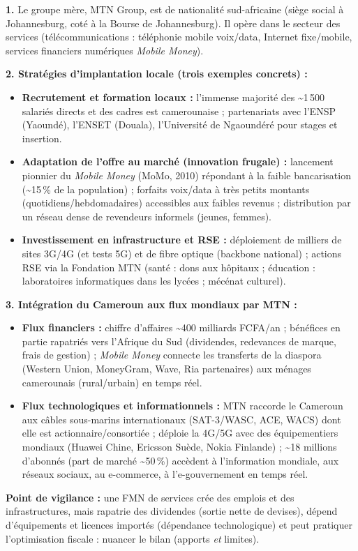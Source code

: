 \documentclass[11pt]{article}
\newcommand{\cle}[1]{{\popxbold\color{popdark}#1}}
\begin{document}
\begin{corrige}
\textbf{1.} Le groupe mère, MTN Group, est de nationalité \cle{sud-africaine} (siège social à Johannesburg, coté à la Bourse de Johannesburg). Il opère dans le secteur des \cle{services} (télécommunications : téléphonie mobile voix/data, Internet fixe/mobile, services financiers numériques \emph{Mobile Money}).

\textbf{2. Stratégies d'implantation locale (trois exemples concrets) :}
\begin{itemize}
    \item \textbf{Recrutement et formation locaux :} l'immense majorité des \textasciitilde 1\,500 salariés directs et des cadres est camerounaise ; partenariats avec l'ENSP (Yaoundé), l'ENSET (Douala), l'Université de Ngaoundéré pour stages et insertion.
    \item \textbf{Adaptation de l'offre au marché (innovation frugale) :} lancement pionnier du \emph{Mobile Money} (MoMo, 2010) répondant à la faible bancarisation (\textasciitilde 15\,\% de la population) ; forfaits voix/data à très petits montants (quotidiens/hebdomadaires) accessibles aux faibles revenus ; distribution par un réseau dense de revendeurs informels (jeunes, femmes).
    \item \textbf{Investissement en infrastructure et RSE :} déploiement de milliers de sites 3G/4G (et tests 5G) et de fibre optique (backbone national) ; actions RSE via la Fondation MTN (santé : dons aux hôpitaux ; éducation : laboratoires informatiques dans les lycées ; mécénat culturel).
\end{itemize}

\textbf{3. Intégration du Cameroun aux flux mondiaux par MTN :}
\begin{itemize}
    \item \textbf{Flux financiers :} chiffre d'affaires \textasciitilde 400 milliards FCFA/an ; bénéfices en partie rapatriés vers l'Afrique du Sud (dividendes, redevances de marque, frais de gestion) ; \emph{Mobile Money} connecte les transferts de la diaspora (Western Union, MoneyGram, Wave, Ria partenaires) aux ménages camerounais (rural/urbain) en temps réel.
    \item \textbf{Flux technologiques et informationnels :} MTN raccorde le Cameroun aux câbles sous-marins internationaux (SAT-3/WASC, ACE, WACS) dont elle est actionnaire/consortiée ; déploie la 4G/5G avec des équipementiers mondiaux (Huawei Chine, Ericsson Suède, Nokia Finlande) ; \textasciitilde 18 millions d'abonnés (part de marché \textasciitilde 50\,\%) accèdent à l'information mondiale, aux réseaux sociaux, au e-commerce, à l'e-gouvernement en temps réel.
\end{itemize}
\textbf{Point de vigilance :} une FMN de services crée des emplois et des infrastructures, mais rapatrie des dividendes (sortie nette de devises), dépend d'équipements et licences importés (dépendance technologique) et peut pratiquer l'optimisation fiscale : nuancer le bilan (apports \emph{et} limites).
\end{corrige}
\end{document}
